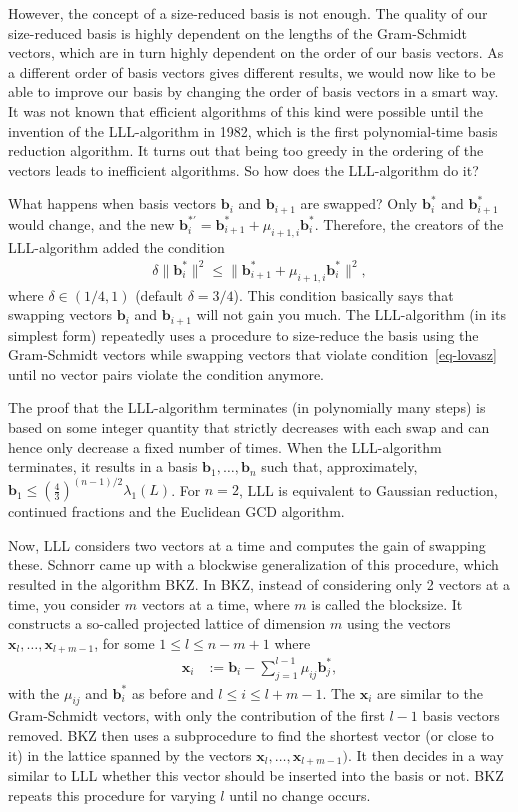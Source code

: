 \documentclass{article}[11pt]
\newcommand{\bfb}{\mathbf{b}}
\newcommand{\bfx}{\mathbf{x}}
\newcommand*{\sumi}[3]{{\sum_{#1 = #2}^{#3}}}
\begin{document}
However, the concept of a size-reduced basis is not enough. The quality of our size-reduced basis is highly dependent on the lengths of the Gram-Schmidt vectors, which are in turn highly dependent on the order of our basis vectors. As a different order of basis vectors gives different results, we would now like to be able to improve our basis by changing the order of basis vectors in a smart way. It was not known that efficient algorithms of this kind were possible until the invention of the LLL-algorithm in 1982, which is the first polynomial-time basis reduction algorithm. It turns out that being too greedy in the ordering of the vectors leads to inefficient algorithms. So how does the LLL-algorithm do it?

What happens when basis vectors $\bfb_i$ and $\bfb_{i+1}$ are swapped? Only $\bfb_i^*$ and $\bfb_{i+1}^*$ would change, and the new $\bfb_i^{*'} = \bfb_{i+1}^* + \mu_{i+1,i}\bfb_i^*$. Therefore, the creators of the LLL-algorithm added the condition
    \begin{align}
    \label{eq-lovasz}
    \delta\|\bfb_i^*\|^2\leq \|\bfb_{i+1}^* + \mu_{i+1,i}\bfb_i^*\|^2,
    \end{align}
where $\delta \in (1/4,1)$ (default $\delta = 3/4$). This condition basically says that swapping vectors $\bfb_i$ and $\bfb_{i+1}$ will not gain you much. The LLL-algorithm (in its simplest form) repeatedly uses a procedure to size-reduce the basis using the Gram-Schmidt vectors while swapping vectors that violate condition~\eqref{eq-lovasz} until no vector pairs violate the condition anymore.

The proof that the LLL-algorithm terminates (in polynomially many steps) is based on some integer quantity that strictly decreases with each swap and can hence only decrease a fixed number of times. When the LLL-algorithm terminates, it results in a basis $\bfb_1,\ldots,\bfb_n$ such that, approximately, $\bfb_1 \leq \left(\frac{4}{3}\right)^{(n-1)/2}\lambda_1(L)$. For $n=2$, LLL is equivalent to Gaussian reduction, continued fractions and the Euclidean GCD algorithm.

Now, LLL considers two vectors at a time and computes the gain of swapping these. Schnorr came up with a blockwise generalization of this procedure, which resulted in the algorithm BKZ. In BKZ, instead of considering only 2 vectors at a time, you consider $m$ vectors at a time, where $m$ is called the blocksize. It constructs a so-called projected lattice of dimension $m$ using the vectors $\bfx_l,\ldots,\bfx_{l+m-1}$, for some $1\leq l\leq n-m+1$ where
    \begin{align*}
    \bfx_i &:= \bfb_i - \sumi{j}{1}{l-1} \mu_{ij}\bfb_j^*,
    \end{align*}
with the $\mu_{ij}$ and $\bfb_i^*$ as before and $l\leq i \leq l+m-1$. The $\bfx_i$ are similar to the Gram-Schmidt vectors, with only the contribution of the first $l-1$ basis vectors removed. BKZ then uses a subprocedure to find the shortest vector (or close to it) in the lattice spanned by the vectors $\bfx_l,\ldots,\bfx_{l+m-1})$. It then decides in a way similar to LLL whether this vector should be inserted into the basis or not. BKZ repeats this procedure for varying $l$ until no change occurs. 
\end{document}
